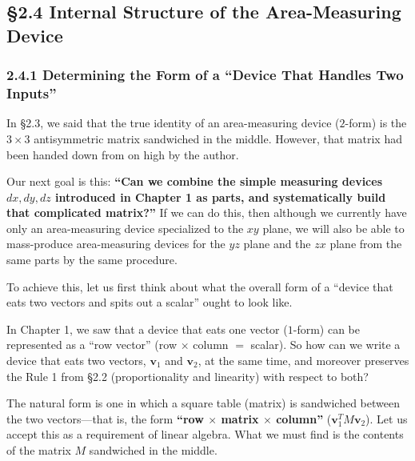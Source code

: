 \documentclass[a4paper,12pt,openany]{book}
\begin{document}
\par\vspace{0.35em}\par

\hypertarget{internal-structure-of-the-area-measuring-device}{%
\subsection{§2.4 Internal Structure of the Area-Measuring
Device}\label{internal-structure-of-the-area-measuring-device}}

\hypertarget{determining-the-form-of-a-device-that-handles-two-inputs}{%
\subsubsection{2.4.1 Determining the Form of a ``Device That Handles Two
Inputs''}\label{determining-the-form-of-a-device-that-handles-two-inputs}}

In §2.3, we said that the true identity of an area-measuring device
(\(2\)-form) is the \(3 \times 3\) antisymmetric matrix sandwiched in
the middle. However, that matrix had been handed down from on high by
the author.

Our next goal is this: \textbf{``Can we combine the simple measuring
devices \(dx, dy, dz\) introduced in Chapter 1 as parts, and
systematically build that complicated matrix?''} If we can do this, then
although we currently have only an area-measuring device specialized to
the \(xy\) plane, we will also be able to mass-produce area-measuring
devices for the \(yz\) plane and the \(zx\) plane from the same parts by
the same procedure.

To achieve this, let us first think about what the overall form of a
``device that eats two vectors and spits out a scalar'' ought to look
like.

In Chapter 1, we saw that a device that eats one vector (\(1\)-form) can
be represented as a ``row vector'' (row \(\times\) column \(=\) scalar).
So how can we write a device that eats two vectors, \(\mathbf{v}_1\) and
\(\mathbf{v}_2\), at the same time, and moreover preserves the Rule 1
from §2.2 (proportionality and linearity) with respect to both?

The natural form is one in which a square table (matrix) is sandwiched
between the two vectors—that is, the form \textbf{``row \(\times\)
matrix \(\times\) column''} (\(\mathbf{v}_1^T M \mathbf{v}_2\)). Let us
accept this as a requirement of linear algebra. What we must find is the
contents of the matrix \(M\) sandwiched in the middle.
\end{document}

